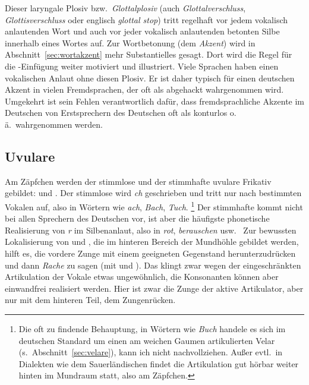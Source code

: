 \begin{exe}
  \ex\label{ex:laryngale005}
  \begin{xlist}
  \end{xlist}
\end{exe}

Dieser laryngale Plosiv bzw.\ \textit{Glottalplosiv} (auch \textit{Glottalverschluss}, \textit{Glottisverschluss} oder englisch \textit{glottal stop}) tritt regelhaft vor jedem vokalisch anlautenden Wort und auch vor jeder vokalisch anlautenden betonten Silbe innerhalb eines Wortes auf.
Zur Wortbetonung (dem \textit{Akzent}) wird in Abschnitt~\ref{sec:wortakzent} mehr Substantielles gesagt.
Dort wird die Regel für die \textipa{[P]}-Einfügung weiter motiviert und illustriert.
Viele Sprachen haben einen vokalischen Anlaut ohne diesen Plosiv.
Er ist daher typisch für einen deutschen Akzent in vielen Fremdsprachen, der oft als abgehackt wahrgenommen wird.
Umgekehrt ist sein Fehlen verantwortlich dafür, dass fremdsprachliche Akzente im Deutschen von Erstsprechern des Deutschen oft als konturlos o.\,ä.\ wahrgenommen werden.

\subsection{Uvulare}
\label{sec:uvulare}


Am Zäpfchen werden der stimmlose und der stimmhafte uvulare Frikativ gebildet: \textipa{[X]} und \textipa{[K]}.
Der stimmlose wird \textit{ch} geschrieben und tritt nur nach bestimmten Vokalen auf, also in Wörtern wie \textit{ach}, \textit{Bach}, \textit{Tuch}.%
\footnote{Die oft zu findende Behauptung, in Wörtern wie \textit{Buch} handele es sich im deutschen Standard um einen am weichen Gaumen artikulierten Velar \textipa{[x]} (s.\ Abschnitt~\ref{sec:velare}), kann ich nicht nachvollziehen.
Außer evtl.\ in Dialekten wie dem Sauerländischen findet die Artikulation gut hörbar weiter hinten im Mundraum statt, also am Zäpfchen.
}
Der stimmhafte kommt nicht bei allen Sprechern des Deutschen vor, ist aber die häufigste phonetische Realisierung von \textit{r} im Silbenanlaut, also in \textit{rot}, \textit{berauschen} usw.
\TuBegin~Zur bewussten Lokalisierung von \textipa{[X]} und \textipa{[K]}, die im hinteren Bereich der Mundhöhle gebildet werden, hilft es, die vordere Zunge mit einem geeigneten Gegenstand herunterzudrücken und dann \zB \textit{Rache} zu sagen (mit \textipa{[K]} und \textipa{[X]}).
Das klingt zwar wegen der eingeschränkten Artikulation der Vokale etwas ungewöhnlich, die Konsonanten können aber einwandfrei realisiert werden.
Hier ist zwar die Zunge der aktive Artikulator, aber nur mit dem hinteren Teil, dem Zungenrücken.

